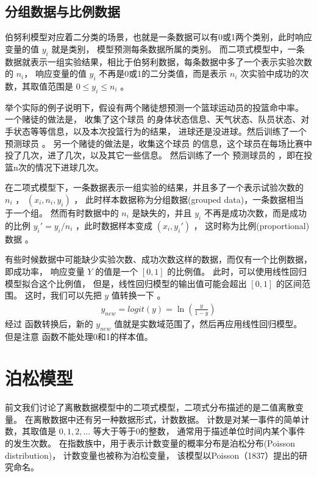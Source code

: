 \documentclass[letterpaper,10pt,english]{sphinxmanual}
\begin{document}
\section{分组数据与比例数据}
\label{\detokenize{_u4e8c_u9879_u6a21_u578b/content:id12}}
伯努利模型对应着二分类的场景，也就是一条数据可以有0或1两个类别，此时响应变量的值 \(y_i\) 就是类别，
模型预测每条数据所属的类别。
而二项式模型中，一条数据就表示一组实验结果，相比于伯努利数据，每条数据中多了一个表示实验次数的 \(n_i\)，
响应变量的值 \(y_i\) 不再是0或1的二分类值，而是表示 \(n_i\) 次实验中成功的次数，其取值范围是
\(0 \le y_i \le n_i\) 。

举个实际的例子说明下，假设有两个赌徒想预测一个篮球运动员的投篮命中率。
一个赌徒的做法是，
收集了这个球员  的身体状态信息、天气状态、队员状态、对手状态等等信息，以及本次投篮行为的结果，
进球还是没进球。然后训练了一个  预测球员  。
另一个赌徒的做法是，收集这个球员  的信息，这个球员在每场比赛中投了几次，进了几次，以及其它一些信息。
然后训练了一个  预测球员的 ，即在投篮n次的情况下进球几次。

在二项式模型下，一条数据表示一组实验的结果，并且多了一个表示试验次数的 \(n_i\) ，
\((x_i,n_i,y_i)\) ，
此时样本数据称为分组数据(grouped data)，一条数据相当于一个组。
然而有时数据中的 \(n_i\) 是缺失的，并且 \(y_i\) 不再是成功次数，而是成功的比例
\(y_i'=y_i/n_i\) ，此时数据样本变成
\((x_i,y_i')\) ， 这时称为比例(proportional)数据 。

有些时候数据中可能缺少实验次数、成功次数这样的数据，而仅有一个比例数据，即成功率，
响应变量 \(Y\) 的值是一个 \([0,1]\) 的比例值。
此时，可以使用线性回归模型拟合这个比例值，
但是，线性回归模型的输出值可能会超出 \([0,1]\) 的区间范围。
这时，我们可以先把 \(y\) 值转换一下 。
\begin{equation}\label{equation:二项模型/content:二项模型/content:50}
\begin{split}y_{new} = logit(y) = \ln \left ( \frac{y}{1-y} \right )\end{split}
\end{equation}
经过  函数转换后，新的 \(y_{new}\) 值就是实数域范围了，然后再应用线性回归模型。
但是注意  函数不能处理0和1的样本值。


\chapter{泊松模型}
\label{\detokenize{_u6cca_u677e_u6a21_u578b/content:id1}}\label{\detokenize{_u6cca_u677e_u6a21_u578b/content::doc}}
前文我们讨论了离散数据模型中的二项式模型，二项式分布描述的是二值离散变量。
在离散数据中还有另一种数据形式，计数数据。
计数是对某一事件的简单计数，其取值是 \(0,1,2,...\) 等大于等于0的整数，
通常用于描述单位时间内某个事件的发生次数。
在指数族中，用于表示计数变量的概率分布是泊松分布(Poisson distribution)，
计数变量也被称为泊松变量，
该模型以Poisson（1837）提出的研究命名。
\end{document}

